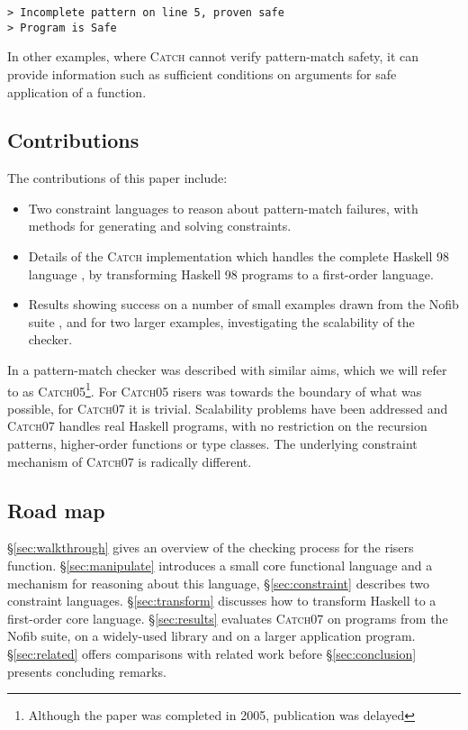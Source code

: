 \documentclass[preprint]{sigplanconf}
\newcommand{\C}[1]{\textsf{#1}}
\newcommand{\catch}{\textsc{Catch}}
\newcommand{\newtool}{\catch07}
\newcommand{\oldtool}{\catch05}
\begin{document}
\begin{verbatim}
> Incomplete pattern on line 5, proven safe
> Program is Safe
\end{verbatim}

In other examples, where \catch{} cannot verify pattern-match safety, it can provide information such as sufficient conditions on arguments for safe application of a function.

\subsection{Contributions}

The contributions of this paper include:

\begin{itemize}
\item Two constraint languages to reason about pattern-match failures, with methods for generating and solving constraints.
\item Details of the \catch{} implementation which handles the complete Haskell 98 language \citep{haskell}, by transforming Haskell 98 programs to a first-order language.
\item Results showing success on a number of small examples drawn from the Nofib suite \citep{nofib}, and for two larger examples, investigating the scalability of the checker.
\end{itemize}

In \citet{me:catch_tfp} a pattern-match checker was described with similar aims, which we will refer to as \oldtool{}\footnote{Although the paper was completed in 2005, publication was delayed}. For \oldtool{} \C{risers} was towards the boundary of what was possible, for \newtool{} it is trivial. Scalability problems have been addressed and \newtool{} handles real Haskell programs, with no restriction on the recursion patterns, higher-order functions or type classes. The underlying constraint mechanism of \newtool{} is radically different.

\subsection{Road map}

\S\ref{sec:walkthrough} gives an overview of the checking process for the \C{risers} function. \S\ref{sec:manipulate} introduces a small core functional language and a mechanism for reasoning about this language, \S\ref{sec:constraint} describes two constraint languages. \S\ref{sec:transform} discusses how to transform Haskell to a first-order core language. \S\ref{sec:results} evaluates \newtool{} on programs from the Nofib suite, on a widely-used library and on a larger application program. \S\ref{sec:related} offers comparisons with related work before \S\ref{sec:conclusion} presents concluding remarks.
\end{document}
